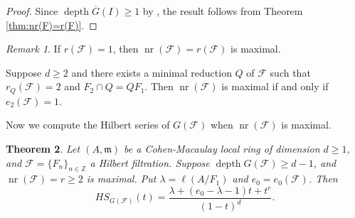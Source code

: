 \documentclass[12pt]{amsart}
\newtheorem{thm}{Theorem}[section]
\theoremstyle{definition}
\theoremstyle{remark}
\newtheorem{rem}[thm]{Remark}
\numberwithin{equation}{section}
\newcommand{\m}{{\mathfrak m}}
\DeclareMathOperator{\depth}{depth}
\DeclareMathOperator{\nr}{{nr}}
\newcommand{\FF}{\mathcal{F}}
\begin{document}
\begin{proof}
Since $\depth{\overline{G}(I)} \geq 1$ 
by \cite[Proposition 3.25]{Mar89},  
the result follows from Theorem \ref{thm:nr(F)=r(F)}.    
\end{proof}

\begin{rem}
If $r(\FF)=1$, then $\nr(\FF)=r(\FF)$ is maximal. 
\par 
Suppose $d \ge 2$ and there exists a minimal reduction 
$Q$ of $\FF$ such that $r_Q(\FF)=2$ and $F_2 \cap Q=QF_1$. Then 
$\nr(\FF)$ is maximal if and only if $e_2(\FF)=1$.  
\end{rem}


\par 
Now we compute the Hilbert series of $G(\FF)$ when $\nr(\FF)$ is maximal.

\begin{thm}\label{thm:HSMaximal}
Let $(A, \m) $ be a Cohen-Macaulay local ring of dimension $d \ge 1$, and $\FF =  \{{F_n}\}_{n\in \mathbb{Z}}$ a Hilbert filtration. 
Suppose $\depth G(\FF) \geq d-1$, and $\nr(\FF)=r \geq 2$ is maximal. 
Put $\lambda=\ell(A/F_1)$ and $e_0=e_0(\FF)$. 
Then 
\begin{equation*}
HS_{{G}(\FF)}(t) = \frac{\lambda + (e_0-\lambda-1)t +t^r}{(1-t)^d}.
\end{equation*}
\end{thm}
\end{document}
